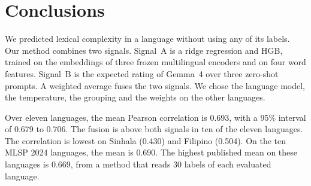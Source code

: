 \documentclass[11pt]{article}
\begin{document}

\section{Conclusions}
\label{sec:conclusions}

We predicted lexical complexity in a language without using any of its labels. Our method combines
two signals. Signal~A is a ridge regression and HGB, trained on the embeddings of three frozen %
multilingual encoders and on four word features. Signal~B is the expected rating of Gemma~4 over %
three zero-shot prompts. A weighted average fuses the two signals. We chose the language model, the %
temperature, the grouping and the weights on the other languages.

Over eleven languages, the mean Pearson correlation is 0.693, with a 95\% interval of 0.679 to %
0.706. The fusion is above both signals in ten of the eleven languages. The correlation is lowest %
on Sinhala (0.430) and Filipino (0.504). On the ten MLSP 2024 languages, the mean is 0.690. The %
highest published mean on these languages is 0.669, from a method that reads 30 labels of each %
evaluated language.
\end{document}
